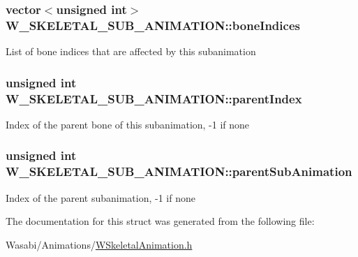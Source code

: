 \subsubsection[{\texorpdfstring{bone\+Indices}{boneIndices}}]{\setlength{\rightskip}{0pt plus 5cm}vector$<$unsigned int$>$ W\+\_\+\+S\+K\+E\+L\+E\+T\+A\+L\+\_\+\+S\+U\+B\+\_\+\+A\+N\+I\+M\+A\+T\+I\+O\+N\+::bone\+Indices}\hypertarget{struct_w___s_k_e_l_e_t_a_l___s_u_b___a_n_i_m_a_t_i_o_n_ac4f644054904f97c600c12de199a6be0}{}\label{struct_w___s_k_e_l_e_t_a_l___s_u_b___a_n_i_m_a_t_i_o_n_ac4f644054904f97c600c12de199a6be0}
List of bone indices that are affected by this subanimation 
\subsubsection[{\texorpdfstring{parent\+Index}{parentIndex}}]{\setlength{\rightskip}{0pt plus 5cm}unsigned int W\+\_\+\+S\+K\+E\+L\+E\+T\+A\+L\+\_\+\+S\+U\+B\+\_\+\+A\+N\+I\+M\+A\+T\+I\+O\+N\+::parent\+Index}\hypertarget{struct_w___s_k_e_l_e_t_a_l___s_u_b___a_n_i_m_a_t_i_o_n_a6b69a69d966354fbcae3671d0d90c416}{}\label{struct_w___s_k_e_l_e_t_a_l___s_u_b___a_n_i_m_a_t_i_o_n_a6b69a69d966354fbcae3671d0d90c416}
Index of the parent bone of this subanimation, -\/1 if none 
\subsubsection[{\texorpdfstring{parent\+Sub\+Animation}{parentSubAnimation}}]{\setlength{\rightskip}{0pt plus 5cm}unsigned int W\+\_\+\+S\+K\+E\+L\+E\+T\+A\+L\+\_\+\+S\+U\+B\+\_\+\+A\+N\+I\+M\+A\+T\+I\+O\+N\+::parent\+Sub\+Animation}\hypertarget{struct_w___s_k_e_l_e_t_a_l___s_u_b___a_n_i_m_a_t_i_o_n_ad05d7883de52bdfeed71b63d6f272236}{}\label{struct_w___s_k_e_l_e_t_a_l___s_u_b___a_n_i_m_a_t_i_o_n_ad05d7883de52bdfeed71b63d6f272236}
Index of the parent subanimation, -\/1 if none 

The documentation for this struct was generated from the following file\+:\begin{DoxyCompactItemize}
\item 
Wasabi/\+Animations/\hyperlink{_w_skeletal_animation_8h}{W\+Skeletal\+Animation.\+h}\end{DoxyCompactItemize}
